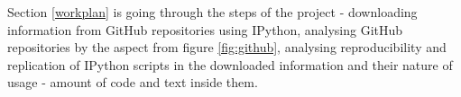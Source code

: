Section \ref{workplan} is going through the steps of the project - downloading information from GitHub repositories using IPython, analysing GitHub repositories by the aspect from figure \ref{fig:github}, analysing reproducibility and replication of IPython scripts in the downloaded information and their nature of usage - amount of code and text inside them. 

